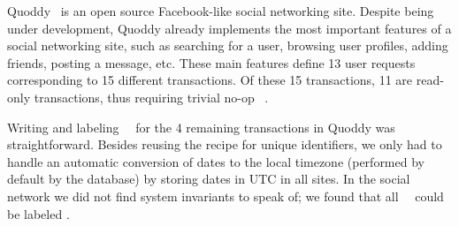 Quoddy~\cite{Quoddy} is an open source Facebook-like social networking
site. Despite being under development, Quoddy already implements the most
important features of a social networking site, such as searching for
a user, browsing user profiles, adding friends,
posting a message, etc.  These main features
define 13 user requests corresponding to 15 different transactions.
Of these 15 transactions, 11 are read-only transactions, thus requiring
trivial no-op \shadow\ \operations.

Writing and labeling \shadow\
\operations\ 
for the 4 remaining transactions in
Quoddy was straightforward. Besides reusing
the recipe for unique identifiers, we only had to handle an automatic
conversion of dates to the local timezone (performed by default
by the database) by storing dates in UTC in all sites.
In the social network
we did not find system invariants to speak of;  we found
that all \shadow\ \transactions\ could be labeled \blue.





